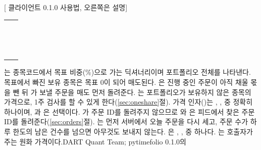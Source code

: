 \def\fclL#1#2{\hspace*{#1mm}\code{#2}}%
\def\fclC#1{\leavevmode{\rmfamily\color{greyD}#1}}%
[ 클라이언트 0.1.0 사용법, 오른쪽은 설명]{%
{\fontsize{7.6}{9.6}\selectfont\begin{tabular}{@{}>{\RaggedRight\arraybackslash}p{106mm} >{\RaggedRight\arraybackslash}p{70mm}@{}}
\fclL{0}{async with Timefolio(91, email=os.environ["EMAIL"],} & \fclC{대회 91. 비밀번호는 넘기기만 하고}\\
\fclL{28.4}{password=os.environ["PASSWORD"]) as tf:} & \fclC{저장하지 않음. 쿠키 묶음은 저장됨}\\[2pt]
\fclL{4}{w = tf.weights()} & \fclC{\code{prodId} $\rightarrow$ 현재 \code{wei}(\%)}\\
\fclL{4}{tf.orders_left()} & \fclC{80에서 오늘의 새 주문과 정지를 뺀 값}\\[2pt]
\fclL{4}{orders = tf.plan(targets, min_wei=0.05, max_total=100,} & \fclC{dry run: 아무것도 보내지 않음}\\
\fclL{27}{prices={"A000660": p}, limit_idx=5)} & \fclC{규칙 위반이면 \code{ValueError}}\\
\fclL{4}{tf.dropped} & \fclC{1주 미만이라 뺀 주문}\\[2pt]
\fclL{4}{try:} & \\
\fclL{8}{ids = await tf.rebalance(targets, limit_idx=5)} & \fclC{\code{plan()} 후 1\,s 간격으로 주문}\\
\fclL{4}{except RebalanceError as e:} & \\
\fclL{8}{e.placed} & \fclC{실패 전에 보낸 주문 ID}\\[2pt]
\fclL{4}{i = await tf.buy("A005930", 0.1, limit_prc=150700)} & \fclC{또는 \code{tf.sell}. 주문 ID를 반환}\\
\fclL{4}{await tf.stop(i)} & \fclC{\code{stop(*ids)}는 여러 개를 받음}\\
\fclL{4}{r = await tf.wait(i)} & \fclC{\code{r.outcome}, \code{r.cum_qty}, \code{r.qty2ord}, \code{r.avg_px}}\\[2pt]
\fclL{4}{g = await tf.guidelines()} & \fclC{\code{g["ok"]}, \code{g["sector"]}, \code{g["turnover"]}}\\
\end{tabular}}}{는 종목코드에서 목표 비중(\%)으로 가는 딕셔너리이며 포트폴리오 전체를 나타낸다. 목표에서 빠진 보유 종목은 목표 0이 되어 매도된다. 은 진행 중인 주문이 아직 채울 몫을 뺀 뒤 가 보낼 주문을 매도 먼저 돌려준다. 는 포트폴리오가 보유하지 않은 종목의 가격으로, 1주 검사를 할 수 있게 한다(\ref{sec:oneshare}절). 가격 인자()는 , ,  중 정확히 하나이며, 과 은 선택이다. 가 주문 ID를 돌려주지 않으므로 와 은 피드에서 찾은 주문 ID를 돌려준다(\ref{sec:orders}절). 는 먼저 서버에서 오늘 주문을 다시 세고, 주문 수가 하루 한도의 남은 건수를 넘으면 아무것도 보내지 않는다. 은 , ,  중 하나다. 는 호출자가 주는 원화 가격이다.}{DART Quant Team; pytimefolio 0.1.0의 }
